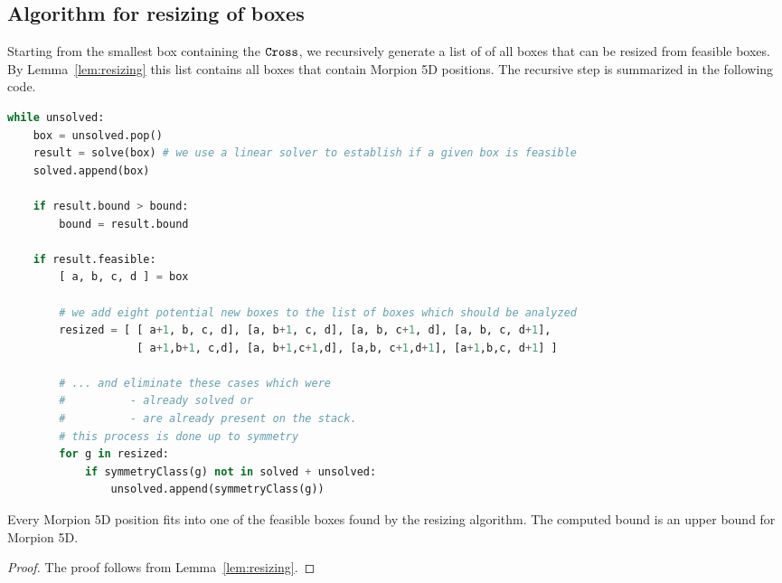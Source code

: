 \subsection{Algorithm for resizing of boxes}
Starting from the smallest box containing the $\texttt{Cross}$, we recursively generate a list of of all boxes 
  that can be resized from feasible boxes.
By Lemma~\ref{lem:resizing} this list contains all boxes that contain Morpion 5D positions.
The recursive step is summarized in the following code.
\begin{lstlisting}[language = Python,
  basicstyle=\ttfamily\scriptsize,keywordstyle=\color{red},backgroundcolor=\color{white}]
while unsolved:
    box = unsolved.pop()
    result = solve(box) # we use a linear solver to establish if a given box is feasible
    solved.append(box)

    if result.bound > bound:
        bound = result.bound
        
    if result.feasible:
        [ a, b, c, d ] = box

        # we add eight potential new boxes to the list of boxes which should be analyzed
        resized = [ [ a+1, b, c, d], [a, b+1, c, d], [a, b, c+1, d], [a, b, c, d+1],
                    [ a+1,b+1, c,d], [a, b+1,c+1,d], [a,b, c+1,d+1], [a+1,b,c, d+1] ]
        
        # ... and eliminate these cases which were 
        #          - already solved or 
        #          - are already present on the stack.
        # this process is done up to symmetry 
        for g in resized:
            if symmetryClass(g) not in solved + unsolved:
                unsolved.append(symmetryClass(g))
\end{lstlisting}

\begin{lemma}
Every Morpion 5D position fits into one of the feasible boxes found by the resizing algorithm.
The computed bound is an upper bound for Morpion 5D.
\end{lemma}

\begin{proof}
  The proof follows from Lemma~\ref{lem:resizing}.
\end{proof} 

